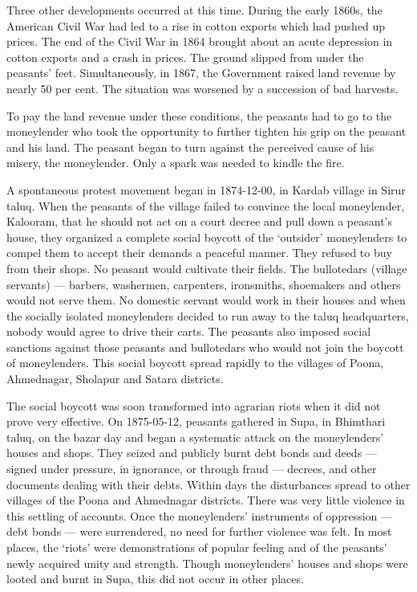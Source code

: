 Three other developments occurred at this time. During the early 1860s, the American Civil War had led to a rise in cotton exports which had pushed up prices. The end of the Civil War in 1864 brought about an acute depression in cotton exports and a crash in prices. The ground slipped from under the peasants’ feet. Simultaneously, in 1867, the Government raised land revenue by nearly 50 per cent. The situation was worsened by a succession of bad harvests.

To pay the land revenue under these conditions, the peasants had to go to the moneylender who took the opportunity to further tighten his grip on the peasant and his land. The peasant began to turn against the perceived cause of his misery, the moneylender. Only a spark was needed to kindle the fire.

A spontaneous protest movement began in 1874-12-00, in Kardab village in Sirur taluq. When the peasants of the village failed to convince the local moneylender, Kalooram, that he should not act on a court decree and pull down a peasant’s house, they organized a complete social boycott of the ‘outsider’ moneylenders to compel them to accept their demands a peaceful manner. They refused to buy from their shops. No peasant would cultivate their fields. The bullotedars (village servants) — barbers, washermen, carpenters, ironsmiths, shoemakers and others would not serve them. No domestic servant would work in their houses and when the socially isolated moneylenders decided to run away to the taluq headquarters, nobody would agree to drive their carts. The peasants also imposed social sanctions against those peasants and bullotedars who would not join the boycott of moneylenders. This social boycott spread rapidly to the villages of Poona, Ahmednagar, Sholapur and Satara districts.

The social boycott was soon transformed into agrarian riots when it did not prove very effective. On 1875-05-12, peasants gathered in Supa, in Bhimthari taluq, on the bazar day and began a systematic attack on the moneylenders’ houses and shops. They seized and publicly burnt debt bonds and deeds — signed under pressure, in ignorance, or through fraud — decrees, and other documents dealing with their debts. Within days the disturbances spread to other villages of the Poona and Ahmednagar districts. There was very little violence in this settling of accounts. Once the moneylenders’ instruments of oppression — debt bonds — were surrendered, no need for further violence was felt. In most places, the ‘riots’ were demonstrations of popular feeling and of the peasants’ newly acquired unity and strength. Though moneylenders’ houses and shops were looted and burnt in Supa, this did not occur in other places.


